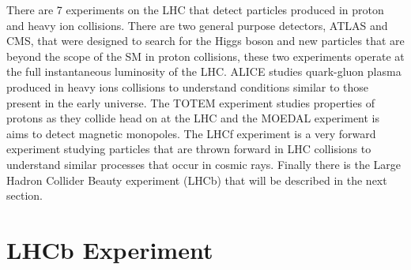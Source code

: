There are 7 experiments on the LHC that detect particles produced in proton and heavy ion collisions. There are two general purpose detectors, ATLAS and CMS, that were designed to search for the Higgs boson and new particles that are beyond the scope of the SM in proton collisions, these two experiments operate at the full instantaneous luminosity of the LHC. %
ALICE studies quark-gluon plasma produced in heavy ions collisions to understand conditions similar to those present in the early universe. The TOTEM experiment studies properties of protons as they collide head on at the LHC and the MOEDAL experiment is aims to detect magnetic monopoles. The LHCf experiment is a very forward experiment studying particles that are thrown forward in LHC collisions to understand similar processes that occur in cosmic rays. Finally there is the Large Hadron Collider Beauty experiment (LHCb) that will be described in the next section. %




\section{LHCb Experiment}
\label{LHCb}


